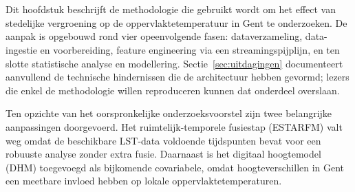 
\chapter{}%
\label{ch:methodologie}


Dit hoofdstuk beschrijft de methodologie die gebruikt wordt om het effect van stedelijke vergroening op de oppervlaktetemperatuur in Gent te onderzoeken.
De aanpak is opgebouwd rond vier opeenvolgende fasen: dataverzameling, data-ingestie en voorbereiding, feature engineering via een streamingspijplijn, en ten slotte statistische analyse en modellering.
Sectie~\ref{sec:uitdagingen} documenteert aanvullend de technische hindernissen die de architectuur hebben gevormd; lezers die enkel de methodologie willen reproduceren kunnen dat onderdeel overslaan.

Ten opzichte van het oorspronkelijke onderzoeksvoorstel zijn twee belangrijke aanpassingen doorgevoerd.
Het ruimtelijk-temporele fusiestap (ESTARFM) valt weg omdat de beschikbare LST-data voldoende tijdspunten bevat voor een robuuste analyse zonder extra fusie.
Daarnaast is het digitaal hoogtemodel (DHM) toegevoegd als bijkomende covariabele, omdat hoogteverschillen in Gent een meetbare invloed hebben op lokale oppervlaktetemperaturen.

